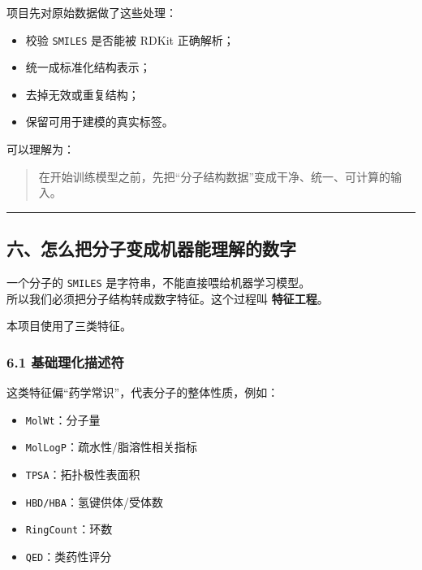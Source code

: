 \documentclass[
  ,
]{ctexart}
\providecommand{\tightlist}{%
  \setlength{\itemsep}{0pt}\setlength{\parskip}{0pt}}
\begin{document}
项目先对原始数据做了这些处理：

\begin{itemize}
\tightlist
\item
  校验 \texttt{SMILES} 是否能被 RDKit 正确解析；
\item
  统一成标准化结构表示；
\item
  去掉无效或重复结构；
\item
  保留可用于建模的真实标签。
\end{itemize}

可以理解为：

\begin{quote}
在开始训练模型之前，先把``分子结构数据''变成干净、统一、可计算的输入。
\end{quote}

\begin{center}\rule{0.5\linewidth}{0.5pt}\end{center}

\hypertarget{ux516dux600eux4e48ux628aux5206ux5b50ux53d8ux6210ux673aux5668ux80fdux7406ux89e3ux7684ux6570ux5b57}{%
\subsection{六、怎么把分子变成机器能理解的数字}\label{ux516dux600eux4e48ux628aux5206ux5b50ux53d8ux6210ux673aux5668ux80fdux7406ux89e3ux7684ux6570ux5b57}}

一个分子的 \texttt{SMILES} 是字符串，不能直接喂给机器学习模型。\\
所以我们必须把分子结构转成数字特征。这个过程叫 \textbf{特征工程}。

本项目使用了三类特征。

\hypertarget{ux57faux7840ux7406ux5316ux63cfux8ff0ux7b26}{%
\subsubsection{6.1
基础理化描述符}\label{ux57faux7840ux7406ux5316ux63cfux8ff0ux7b26}}

这类特征偏``药学常识''，代表分子的整体性质，例如：

\begin{itemize}
\tightlist
\item
  \texttt{MolWt}：分子量
\item
  \texttt{MolLogP}：疏水性/脂溶性相关指标
\item
  \texttt{TPSA}：拓扑极性表面积
\item
  \texttt{HBD/HBA}：氢键供体/受体数
\item
  \texttt{RingCount}：环数
\item
  \texttt{QED}：类药性评分
\end{itemize}
\end{document}
